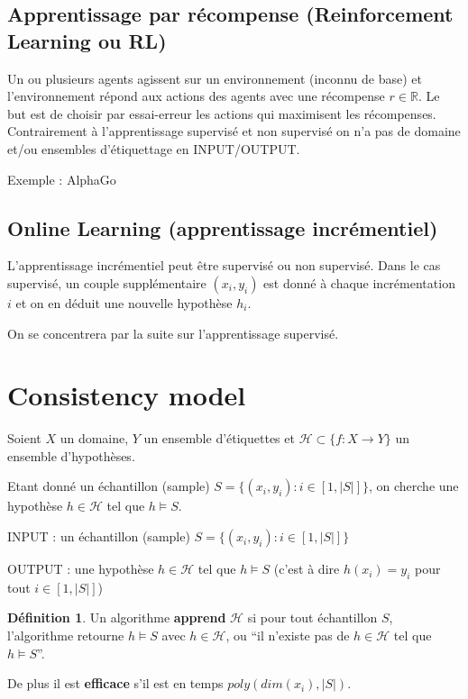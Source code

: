 \documentclass{article}
\theoremstyle{plain}
\theoremstyle{remark}
\theoremstyle{definition}
\newtheorem{defin}[thrm]{Définition}
\begin{document}
\subsection{Apprentissage par récompense (Reinforcement Learning ou RL)}

Un ou plusieurs agents agissent sur un environnement (inconnu de base) et l'environnement répond aux actions des agents avec une récompense $r\in \mathbb{R}$. Le but est de choisir par essai-erreur les actions qui maximisent les récompenses. Contrairement à l'apprentissage supervisé et non supervisé on n'a pas de domaine et/ou ensembles d'étiquettage en INPUT/OUTPUT.

Exemple : AlphaGo

\subsection{Online Learning (apprentissage incrémentiel)}

L'apprentissage incrémentiel peut être supervisé ou non supervisé. Dans le cas supervisé, un couple supplémentaire $(x_i,y_i)$ est donné à chaque incrémentation $i$ et on en déduit une nouvelle hypothèse $h_i$.

On se concentrera par la suite sur l'apprentissage supervisé.


\section{Consistency model}

Soient $X$ un domaine, $Y$ un ensemble d'étiquettes et $\mathcal{H}\subset \{f : X \rightarrow Y \}$ un ensemble d'hypothèses.

Etant donné un échantillon (sample) $S=\{(x_i,y_i):i\in [1,|S|]\}$, on cherche une hypothèse $h\in \mathcal{H}$ tel que $h \models S$.

INPUT : un échantillon (sample) $S=\{(x_i,y_i) : i\in [1,|S|]\}$

OUTPUT : une hypothèse $h\in \mathcal{H}$ tel que $h \models S$ (c'est à dire $h(x_i)=y_i$ pour tout $i\in [1,|S|]$)

\begin{defin}
Un algorithme \textbf{apprend} $\mathcal{H}$ si pour tout échantillon $S$, l'algorithme retourne $h\models S$ avec $h\in \mathcal{H}$, ou ``il n'existe pas de $h\in \mathcal{H}$ tel que $h\models S$''.

De plus il est \textbf{efficace} s'il est en temps $poly(dim(x_i),|S|)$.
\end{defin}
\end{document}
